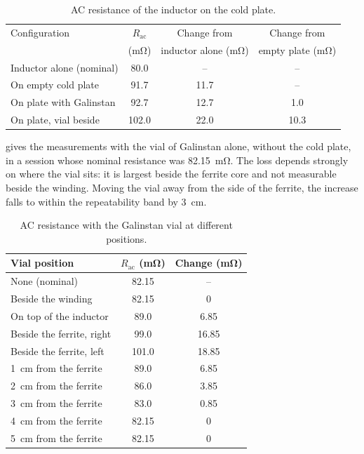 \begin{table}[htbp]
  \centering
  \caption{AC resistance of the inductor on the cold plate.}
  \label{tab:app-rac-plate}
  \small
  \begin{tabular}{@{}lccc@{}}
    \toprule
    Configuration & $R_{\mathrm{ac}}$ & Change from & Change from \\
                  & (\si{\milli\ohm}) & inductor alone (\si{\milli\ohm})
      & empty plate (\si{\milli\ohm}) \\
    \midrule
    Inductor alone (nominal)  & 80.0  & --   & --   \\
    On empty cold plate       & 91.7  & 11.7 & --   \\
    On plate with Galinstan   & 92.7  & 12.7 & 1.0  \\
    On plate, vial beside     & 102.0 & 22.0 & 10.3 \\
    \bottomrule
  \end{tabular}
\end{table}

 gives the measurements with the vial of Galinstan
alone, without the cold plate, in a session whose nominal resistance was
\SI{82.15}{\milli\ohm}. The loss depends strongly on where the vial sits: it is
largest beside the ferrite core and not measurable beside the winding. Moving the vial away
from the side of the ferrite, the increase falls to within the repeatability band
by \SI{3}{\centi\metre}.

\begin{table}[htbp]
  \centering
  \caption{AC resistance with the Galinstan vial at different positions.}
  \label{tab:app-rac-distance}
  \small
  \begin{tabular}{@{}lcc@{}}
    \toprule
    Vial position & $R_{\mathrm{ac}}$ (\si{\milli\ohm}) & Change (\si{\milli\ohm}) \\
    \midrule
    None (nominal)              & 82.15 & --    \\
    Beside the winding          & 82.15 & 0     \\
    On top of the inductor      & 89.0  & 6.85  \\
    Beside the ferrite, right   & 99.0  & 16.85 \\
    Beside the ferrite, left    & 101.0 & 18.85 \\
    \addlinespace
    \SI{1}{\centi\metre} from the ferrite & 89.0  & 6.85 \\
    \SI{2}{\centi\metre} from the ferrite & 86.0  & 3.85 \\
    \SI{3}{\centi\metre} from the ferrite & 83.0  & 0.85 \\
    \SI{4}{\centi\metre} from the ferrite & 82.15 & 0    \\
    \SI{5}{\centi\metre} from the ferrite & 82.15 & 0    \\
    \bottomrule
  \end{tabular}
\end{table}

